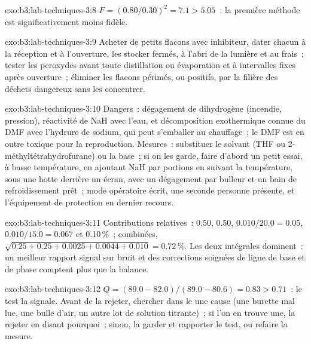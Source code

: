\begin{solution}{exo:b3:lab-techniques-3:8}
$F = (0.80/0.30)^2 = 7.1 > 5.05$~: la première méthode est significativement moins fidèle.
\end{solution}

\begin{solution}{exo:b3:lab-techniques-3:9}
Acheter de petits flacons avec inhibiteur, dater chacun à la réception et
à l'ouverture, les stocker fermés, à l'abri de la lumière et au frais~;
tester les peroxydes avant toute distillation ou évaporation et à
intervalles fixes après ouverture~; éliminer les flacons périmés, ou
positifs, par la filière des déchets dangereux sans les concentrer.
\end{solution}

\begin{solution}{exo:b3:lab-techniques-3:10}
Dangers~: dégagement de dihydrogène (incendie, pression), réactivité de
NaH avec l'eau, et décomposition exothermique connue du DMF avec l'hydrure
de sodium, qui peut s'emballer au chauffage~; le DMF est en outre toxique
pour la reproduction. Mesures~: substituer le solvant (THF ou
2-méthyltétrahydrofurane) ou la base~; si on les garde, faire d'abord un
petit essai, à basse température, en ajoutant NaH par portions en suivant
la température, sous une hotte derrière un écran, avec un dégagement par
bulleur et un bain de refroidissement prêt~; mode opératoire écrit, une
seconde personne présente, et l'équipement de protection en dernier
recours.
\end{solution}

\begin{solution}{exo:b3:lab-techniques-3:11}
Contributions relatives~: 0.50, 0.50, $0.010/20.0 = 0.05$, $0.010/15.0 = 0.067$ et 0.10\,\%~; combinées,
$\sqrt{0.25 + 0.25 + 0.0025 + 0.0044 + 0.010} = 0.72$\,\%. Les deux intégrales dominent~: un meilleur rapport signal sur bruit
et des corrections soignées de ligne de base et de phase comptent plus que
la balance.
\end{solution}

\begin{solution}{exo:b3:lab-techniques-3:12}
$Q = (89.0 - 82.0)/(89.0 - 80.6) = 0.83 > 0.71$~: le test la signale. Avant de la rejeter, chercher dans le  une cause (une burette mal lue, une bulle d'air, un autre
lot de solution titrante)~; si l'on en trouve une, la rejeter en disant
pourquoi~; sinon, la garder et rapporter le test, ou refaire la mesure.
\end{solution}

